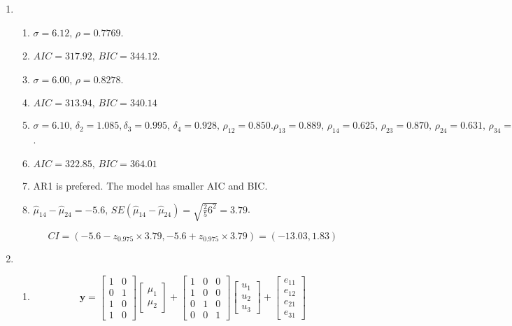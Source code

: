 \documentclass{article}
\begin{document}
\begin{enumerate}[leftmargin = 0 em, label = \arabic*., font = \bfseries]
	\item 
	\begin{enumerate}
		\item 
		$\sigma = 6.12,\, \rho = 0.7769$.

		\item 
		$AIC = 317.92,\, BIC = 344.12$.

		\item 
		$\sigma = 6.00,\, \rho = 0.8278$.


		\item 
		$AIC =  313.94,\, BIC = 340.14$

		\item 
		$\sigma = 6.10,\, \delta_{2} = 1.085, \delta_3 = 0.995,\, \delta_{4} = 0.928,\, \rho_{12} = 0.850. \rho_{13} = 0.889,\, \rho_{14} = 0.625,\, \rho_{23} = 0.870,\, \rho_{24} = 0.631,\, \rho_{34} = 0.794$.

		\item 
		$AIC = 322.85,\, BIC = 364.01$

		\item 
		AR1 is prefered. The model has smaller AIC and BIC.
		\item 
		$\hat{\mu}_{14} - \hat{\mu}_{24} = -5.6,\, SE(\hat{\mu}_{14} - \hat{\mu}_{24}) = \sqrt{\frac{2}{5} 6^2} = 3.79$.

		\[CI = (-5.6 - z_{0.975} \times 3.79, - 5.6 + z_{0.975} \times 3.79) = (-13.03, 1.83)\]

	\end{enumerate}


	\item 
	\begin{enumerate}
		\item 
		\[\bm y = \begin{bmatrix}
			1 & 0\\
			0 & 1\\
			1 & 0\\
			1 & 0
		\end{bmatrix} \begin{bmatrix}
			\mu_{1}\\ \mu_2
		\end{bmatrix} + \begin{bmatrix}
			1 & 0 & 0\\
			1 & 0 & 0\\
			0 & 1 & 0\\
			0 & 0 & 1
		\end{bmatrix} \begin{bmatrix}
			u_1 \\ u_2 \\ u_3
		\end{bmatrix} + \begin{bmatrix}
			e_{11} \\e_{12} \\ e_{21} \\ e_{31}
		\end{bmatrix}\]


\end{enumerate}
\end{enumerate}
\end{document}
